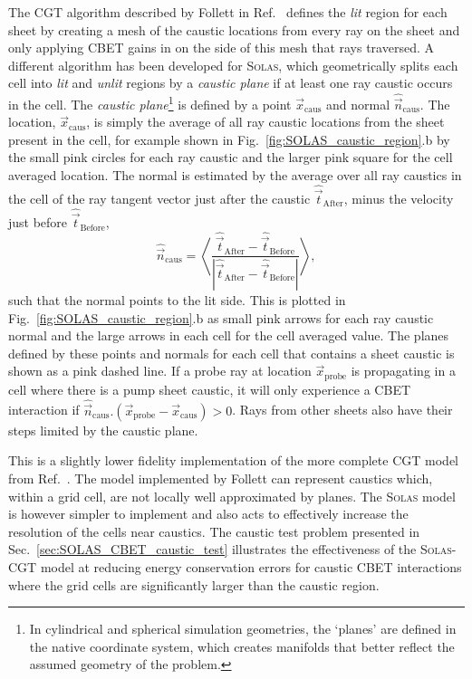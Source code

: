 The \ac{CGT} algorithm described by Follett in Ref.~\cite{follett_ray-based_2018} defines the \textit{lit} region for each sheet by creating a mesh of the caustic locations from every ray on the sheet and only applying \ac{CBET} gains in on the side of this mesh that rays traversed.
A different algorithm has been developed for \textsc{Solas}, which geometrically splits each cell into \textit{lit} and \textit{unlit} regions by a \textit{caustic plane} if at least one ray caustic occurs in the cell.
The \textit{caustic plane}\footnote{In cylindrical and spherical simulation geometries, the `planes' are defined in the native coordinate system, which creates manifolds that better reflect the assumed geometry of the problem.} is defined by a point $\vec{x}_{\text{caus}}$ and normal $\hat{\vec{n}}_{\text{caus}}$.
The location, $\vec{x}_{\text{caus}}$, is simply the average of all ray caustic locations from the sheet present in the cell, for example shown in Fig.~\ref{fig:SOLAS_caustic_region}.b by the small pink circles for each ray caustic and the larger pink square for the cell averaged location.
The normal is estimated by the average over all ray caustics in the cell of the ray tangent vector just after the caustic $\hat{\vec{t}}_{\text{After}}$, minus the velocity just before $\hat{\vec{t}}_{\text{Before}}$,
\begin{equation}
    \hat{\vec{n}}_{\text{caus}} = \left\langle \frac{ \hat{\vec{t}}_{\text{After}} - \hat{\vec{t}}_{\text{Before}} }{ | \hat{\vec{t}}_{\text{After}} - \hat{\vec{t}}_{\text{Before}} | } \right\rangle,
\end{equation}
such that the normal points to the lit side.
This is plotted in Fig.~\ref{fig:SOLAS_caustic_region}.b as small pink arrows for each ray caustic normal and the large arrows in each cell for the cell averaged value.
The planes defined by these points and normals for each cell that contains a sheet caustic is shown as a pink dashed line.
If a probe ray at location $\vec{x}_{\text{probe}}$ is propagating in a cell where there is a pump sheet caustic, it will only experience a \ac{CBET} interaction if $\hat{\vec{n}}_{\text{caus}}.(\vec{x}_{\text{probe}} - \vec{x}_{\text{caus}})>0$.
Rays from other sheets also have their steps limited by the caustic plane.

This is a slightly lower fidelity implementation of the more complete \ac{CGT} model from Ref.~\cite{follett_ray-based_2018}.
The model implemented by Follett can represent caustics which, within a grid cell, are not locally well approximated by planes.
The \textsc{Solas} model is however simpler to implement and also acts to effectively increase the resolution of the cells near caustics.
The caustic test problem presented in Sec.~\ref{sec:SOLAS_CBET_caustic_test} illustrates the effectiveness of the \textsc{Solas}-\ac{CGT} model at reducing energy conservation errors for caustic \ac{CBET} interactions where the grid cells are significantly larger than the caustic region.

